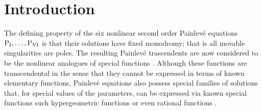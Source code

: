 \documentclass{amsart}
\theoremstyle{definition}
\begin{document}
\section{Introduction}

The defining property of the six nonlinear second order Painlev\'e
equations ${\rm P_I,\dots,P_{VI}}$ is that their solutions have fixed
monodromy; that is all movable singularities are poles.  The resulting
Painlev\'e trascendents are now considered to be the nonlinear
analogues of special functions
\cite{clarkson2003painleve,fokas2006painleve}. Although these
functions are transcendental in the sense that they cannot be
expressed in terms of known elementary functions, Painlev\'e equations
also possess special families of solutions that, for special values of
the parameters, can be expressed via known special functions such
hypergeometric functions or even rational functions
\cite{airault1979rational}.
\end{document}
